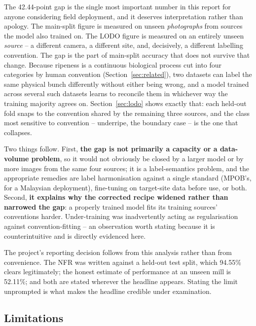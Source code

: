 \documentclass{article}
\begin{document}
The 42.44-point gap is the single most important number in this report for anyone considering field
deployment, and it deserves interpretation rather than apology. The main-split figure is measured on
unseen \textit{photographs} from sources the model also trained on. The LODO figure is measured on an
entirely unseen \textit{source} -- a different camera, a different site, and, decisively, a different
labelling convention. The gap is the part of main-split accuracy that does not survive that change.
Because ripeness is a continuous biological process cut into four categories by human convention
(Section~\ref{sec:related}), two datasets can label the same physical bunch differently without either
being wrong, and a model trained across several such datasets learns to reconcile them in whichever way
the training majority agrees on. Section~\ref{sec:lodo} shows exactly that: each held-out fold snaps to the
convention shared by the remaining three sources, and the class most sensitive to convention -- underripe,
the boundary case -- is the one that collapses.

Two things follow. First, \textbf{the gap is not primarily a capacity or a data-volume problem}, so it
would not obviously be closed by a larger model or by more images from the same four sources; it is a
label-semantics problem, and the appropriate remedies are label harmonisation against a single standard
(MPOB's, for a Malaysian deployment), fine-tuning on target-site data before use, or both. Second, \textbf{
it explains why the corrected recipe widened rather than narrowed the gap}: a properly trained model fits
its training sources' conventions harder. Under-training was inadvertently acting as regularisation
against convention-fitting -- an observation worth stating because it is counterintuitive and is directly
evidenced here.

The project's reporting decision follows from this analysis rather than from convenience. The NFR was
written against a held-out test split, which 94.55\% clears legitimately; the honest estimate of
performance at an unseen mill is 52.11\%; and both are stated wherever the headline appears. Stating the
limit unprompted is what makes the headline credible under examination.

\subsection{Limitations}
\label{sec:limitations}
\end{document}
